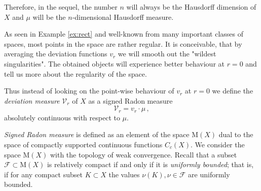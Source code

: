 \documentclass[12pt,leqno,intlimits]{amsart}
\numberwithin{equation}{section}
\theoremstyle{definition}
\theoremstyle{remark}
\newtheorem{ex}[thm]{Example}
\newcommand{\R}{\mathbb{R}}
\begin{document}
{ Therefore, in the sequel, the number $n$ will always be the Hausdorff dimension of $X$ and $\mu$ will be the $n$-dimensional Hausdorff measure.


As seen in Example \ref{ex:rect} and well-known from many important classes of spaces, most points in the space are rather regular.
 It is  conceivable, that by averaging  the deviation functions $v_r$ we will smooth out the "wildest singularities". The obtained objects will experience  better behaviour at $r=0$ and tell us more about
 the  regularity of the space. 
 




Thus instead of looking on the point-wise behaviour of $v_r$ at $r=0$ we 
 define the \emph{deviation measure} $\mathcal{V}_r$ of $X$ as a signed Radon measure \begin{equation} \label{eq:first}
\mathcal{V}_r = v_r \cdot \mu \, ,
\end{equation}
absolutely continuous with respect to $\mu$.}

\emph{Signed Radon measure} is defined as an element of the space $\mathrm M(X)$ dual to the space of compactly supported continuous functions $C_c (X)$.
We consider the space $\mathrm M(X)$ with the topology of weak convergence.
Recall that a subset $\mathcal F \subset \mathrm M(X)$ is relatively compact if and only if
it is \emph{uniformly bounded};
that is, if for any compact subset $K\subset X$ the values $\nu (K), \nu \in \mathcal F$ are uniformly bounded.


\end{document}
